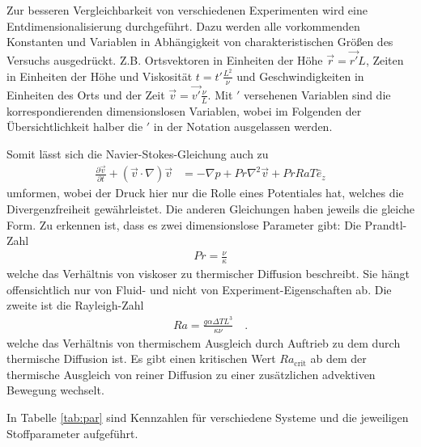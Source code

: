 \documentclass[12pt,a4paper,titlepage,headinclude]{scrartcl}
\numberwithin{equation}{subsection}
\begin{document}
Zur besseren Vergleichbarkeit von verschiedenen Experimenten wird eine Entdimensionalisierung durchgeführt.
Dazu werden alle vorkommenden Konstanten und Variablen in Abhängigkeit von charakteristischen Größen des Versuchs ausgedrückt.
Z.B. Ortsvektoren in Einheiten der Höhe $\vec{r}=\vec{r'} L$, Zeiten in Einheiten der Höhe und Viskosität $t=t' \frac{L^2}{\nu}$ und Geschwindigkeiten in Einheiten des Orts und der Zeit $\vec{v}=\vec{v'}\frac{\nu}{L}$.
Mit $'$ versehenen Variablen sind die korrespondierenden dimensionslosen Variablen, wobei im Folgenden der Übersichtlichkeit halber die $'$ in der Notation ausgelassen werden.

Somit lässt sich die Navier-Stokes-Gleichung auch zu
\begin{align}
	\frac{\partial \vec{v}}{\partial t}+\left( \vec{v}\cdot\nabla \right)\vec{v} &= -\nabla p + Pr\nabla^2\vec{v}+PrRaT\hat{e}_z
\end{align}
umformen, wobei der Druck hier nur die Rolle eines Potentiales hat, welches die Divergenzfreiheit gewährleistet.
Die anderen Gleichungen haben jeweils die gleiche Form.
Zu erkennen ist, dass es zwei dimensionslose Parameter gibt:
Die Prandtl-Zahl
\begin{align}
	Pr=\frac{\nu}{\kappa}\label{eq:Pr}
\end{align}
welche das Verhältnis von viskoser zu thermischer Diffusion beschreibt.
Sie hängt offensichtlich nur von Fluid- und nicht von Experiment-Eigenschaften ab.
Die zweite ist die Rayleigh-Zahl
\begin{align}
	Ra=\frac{g\alpha\Delta T L^3}{\kappa\nu}\quad.\label{eq:Ra}
\end{align}
welche das Verhältnis von thermischem Ausgleich durch Auftrieb zu dem durch thermische Diffusion ist.
Es gibt einen kritischen Wert $Ra_\text{crit}$ ab dem der thermische Ausgleich von reiner Diffusion zu einer zusätzlichen advektiven Bewegung wechselt.

In Tabelle \ref{tab:par} sind Kennzahlen für verschiedene Systeme und die jeweiligen Stoffparameter aufgeführt.
\end{document}
